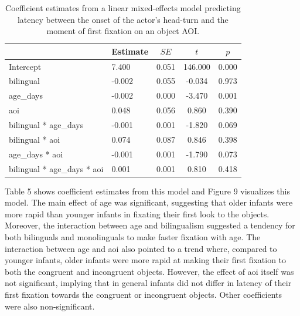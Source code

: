 \documentclass[,man,floatsintext]{apa6}
\begin{document}
\begin{table}[tbp]
\begin{center}
\begin{threeparttable}
\caption{\label{tab:coef_table_latency}Coefficient estimates from a linear mixed-effects model predicting latency between the onset of the actor's head-turn and the moment of first fixation on an object AOI.}
\begin{tabular}{llccc}
\toprule
 & Estimate & $SE$ & $t$ & $p$\\
\midrule
Intercept & 7.400 & 0.051 & 146.000 & 0.000\\
bilingual & -0.002 & 0.055 & -0.034 & 0.973\\
age\_days & -0.002 & 0.000 & -3.470 & 0.001\\
aoi & 0.048 & 0.056 & 0.860 & 0.390\\
bilingual * age\_days & -0.001 & 0.001 & -1.820 & 0.069\\
bilingual * aoi & 0.074 & 0.087 & 0.846 & 0.398\\
age\_days * aoi & -0.001 & 0.001 & -1.790 & 0.073\\
bilingual * age\_days * aoi & 0.001 & 0.001 & 0.810 & 0.418\\
\bottomrule
\end{tabular}
\end{threeparttable}
\end{center}
\end{table}

\noindent Table 5 shows coefficient estimates from this model and Figure 9 visualizes this model. The main effect of age was significant, suggesting that older infants were more rapid than younger infants in fixating their first look to the objects. Moreover, the interaction between age and bilingualism suggested a tendency for both bilinguals and monolinguals to make faster fixation with age. The interaction between age and aoi also pointed to a trend where, compared to younger infants, older infants were more rapid at making their first fixation to both the congruent and incongruent objects. However, the effect of aoi itself was not significant, implying that in general infants did not differ in latency of their first fixation towards the congruent or incongruent objects. Other coefficients were also non-significant.
\end{document}
